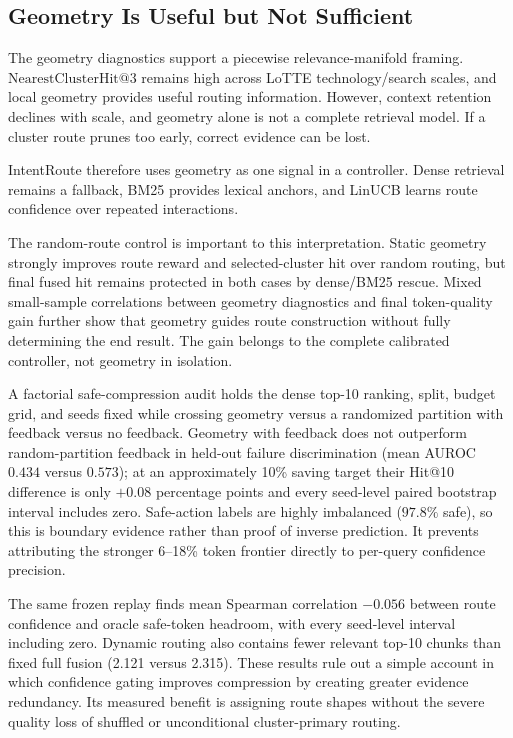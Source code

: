 \subsection{Geometry Is Useful but Not Sufficient}
\label{sec:07-discussion:geometry-is-useful-but-not-sufficient}

The geometry diagnostics support a piecewise relevance-manifold framing. $\mathrm{NearestClusterHit@3}$ remains high across LoTTE technology/search scales, and local geometry provides useful routing information. However, context retention declines with scale, and geometry alone is not a complete retrieval model. If a cluster route prunes too early, correct evidence can be lost.

IntentRoute therefore uses geometry as one signal in a controller. Dense retrieval remains a fallback, BM25 provides lexical anchors, and LinUCB learns route confidence over repeated interactions.

The random-route control is important to this interpretation. Static geometry strongly improves route reward and selected-cluster hit over random routing, but final fused hit remains protected in both cases by dense/BM25 rescue. Mixed small-sample correlations between geometry diagnostics and final token-quality gain further show that geometry guides route construction without fully determining the end result. The gain belongs to the complete calibrated controller, not geometry in isolation.

A factorial safe-compression audit holds the dense top-10 ranking, split, budget grid, and seeds fixed while crossing geometry versus a randomized partition with feedback versus no feedback. Geometry with feedback does not outperform random-partition feedback in held-out failure discrimination (mean AUROC $0.434$ versus $0.573$); at an approximately 10\% saving target their Hit@10 difference is only $+0.08$ percentage points and every seed-level paired bootstrap interval includes zero. Safe-action labels are highly imbalanced ($97.8\%$ safe), so this is boundary evidence rather than proof of inverse prediction. It prevents attributing the stronger 6--18\% token frontier directly to per-query confidence precision.

The same frozen replay finds mean Spearman correlation $-0.056$ between route confidence and oracle safe-token headroom, with every seed-level interval including zero. Dynamic routing also contains fewer relevant top-10 chunks than fixed full fusion (2.121 versus 2.315). These results rule out a simple account in which confidence gating improves compression by creating greater evidence redundancy. Its measured benefit is assigning route shapes without the severe quality loss of shuffled or unconditional cluster-primary routing.

